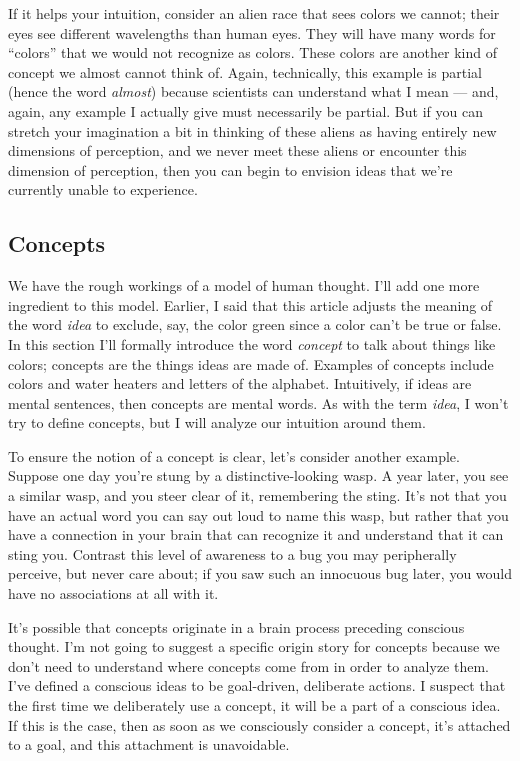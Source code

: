 \documentclass[11pt, oneside]{article}
\begin{document}
If it helps your intuition, consider an alien race that sees colors we cannot;
their eyes see different wavelengths than human eyes.
They will have many words for ``colors''
that we would not recognize as colors. These colors are another kind of concept
we almost cannot think of.
Again, technically, this example is
partial (hence the word {\em almost})
because scientists can understand what I mean --- and, again, any
example I actually give must necessarily be partial. But if you can stretch your
imagination a bit in thinking of these aliens as having entirely new dimensions
of perception, and we never meet these aliens or encounter this dimension of
perception, then you can begin to envision ideas that we're currently
unable to experience.

\subsection{Concepts}\label{s_mental_words}

We have the rough workings of a model of human thought.
I'll add one more
ingredient to this model.
Earlier, I said that this article adjusts the meaning of the word
{\em idea} to exclude, say, the color green since a color
can't be true or false.
In this section I'll formally introduce the word {\em concept} to talk about
things like colors;
concepts are
the things ideas are made of.
Examples of concepts include
colors and water heaters and letters of the alphabet.
Intuitively, if
ideas are mental sentences, then
concepts are mental words.
As with the term {\em idea}, I won't try to define concepts,
but I will analyze our intuition around them.

To ensure the notion of a concept is clear, let's consider another example.
Suppose one day you're stung
by a distinctive-looking wasp.
A year later, you see a similar wasp, and you
steer clear of it, remembering the sting.
It's not that you have an actual word you can say out loud to name this wasp,
but rather that you have a connection in your brain that can recognize it and
understand that it can sting you.
Contrast this level of awareness to a bug you may peripherally perceive, but
never care about; if you saw such an innocuous bug later, you would have no
associations at all with it.

It's possible that concepts originate in a brain process preceding conscious
thought.
I'm not going to suggest a specific origin story for concepts
because we don't need to understand where concepts come from in
order to analyze them.
I've defined a conscious ideas to be goal-driven, deliberate actions.
I suspect that
the first time we deliberately use a concept, it will be a
part of a conscious idea.
If this is the case, then
as soon as we consciously consider a concept, it's attached
to a goal, and this attachment is unavoidable.
\end{document}
